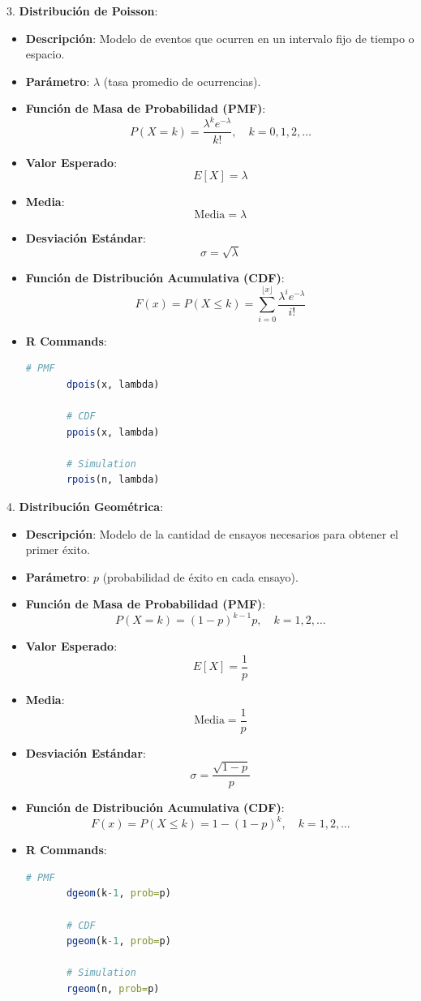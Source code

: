\documentclass{article}
\begin{document}
3. \textbf{{\Large Distribución de Poisson}}:
   \begin{itemize}
       \item \textbf{Descripción}: Modelo de eventos que ocurren en un intervalo fijo de tiempo o espacio.
       \item \textbf{Parámetro}: \( \lambda \) (tasa promedio de ocurrencias).
       \item \textbf{Función de Masa de Probabilidad (PMF)}:
       \[
       P(X=k) = \frac{\lambda^k e^{-\lambda}}{k!}, \quad k = 0, 1, 2, \ldots
       \]
       \item \textbf{Valor Esperado}:
       \[
       E[X] = \lambda
       \]
       \item \textbf{Media}:
       \[
       \text{Media} = \lambda
       \]
       \item \textbf{Desviación Estándar}:
       \[
       \sigma = \sqrt{\lambda}
       \]
       \item \textbf{Función de Distribución Acumulativa (CDF)}:
       \[
       F(x) = P(X \leq k) = \sum_{i=0}^{\lfloor x \rfloor} \frac{\lambda^i e^{-\lambda}}{i!}
       \]
       \item \textbf{R Commands}:
       \begin{lstlisting}[style=colored, language=R]
       # PMF
       dpois(x, lambda)
       
       # CDF
       ppois(x, lambda)
       
       # Simulation
       rpois(n, lambda)
       \end{lstlisting}
   \end{itemize}

4. \textbf{{\Large Distribución Geométrica}}:
   \begin{itemize}
       \item \textbf{Descripción}: Modelo de la cantidad de ensayos necesarios para obtener el primer éxito.
       \item \textbf{Parámetro}: \( p \) (probabilidad de éxito en cada ensayo).
       \item \textbf{Función de Masa de Probabilidad (PMF)}:
       \[
       P(X=k) = (1-p)^{k-1} p, \quad k = 1, 2, \ldots
       \]
       \item \textbf{Valor Esperado}:
       \[
       E[X] = \frac{1}{p}
       \]
       \item \textbf{Media}:
       \[
       \text{Media} = \frac{1}{p}
       \]
       \item \textbf{Desviación Estándar}:
       \[
       \sigma = \frac{\sqrt{1-p}}{p}
       \]
       \item \textbf{Función de Distribución Acumulativa (CDF)}:
       \[
       F(x) = P(X \leq k) = 1 - (1-p)^k, \quad k = 1, 2, \ldots
       \]
       \item \textbf{R Commands}:
       \begin{lstlisting}[style=colored, language=R]
       # PMF
       dgeom(k-1, prob=p)
       
       # CDF
       pgeom(k-1, prob=p)
       
       # Simulation
       rgeom(n, prob=p)
       \end{lstlisting}
   \end{itemize}
\end{document}
